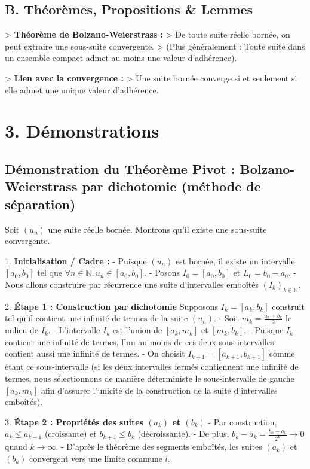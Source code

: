 \documentclass{report}
\begin{document}
\subsection*{B. Théorèmes, Propositions \& Lemmes}
> \textbf{Théorème de Bolzano-Weierstrass :}
> De toute suite réelle bornée, on peut extraire une sous-suite convergente.
> (Plus généralement : Toute suite dans un ensemble compact admet au moins une valeur d'adhérence).

> \textbf{Lien avec la convergence :}
> Une suite bornée converge si et seulement si elle admet une unique valeur d'adhérence.

\section*{3. Démonstrations}

\subsection*{Démonstration du Théorème Pivot : Bolzano-Weierstrass par dichotomie (méthode de séparation)}
Soit $(u_n)$ une suite réelle bornée. Montrons qu'il existe une sous-suite convergente.

1. \textbf{Initialisation / Cadre :}
   - Puisque $(u_n)$ est bornée, il existe un intervalle $[a_0, b_0]$ tel que $\forall n \in \mathbb{N}, u_n \in [a_0, b_0]$.
   - Posons $I_0 = [a_0, b_0]$ et $L_0 = b_0 - a_0$.
   - Nous allons construire par récurrence une suite d'intervalles emboîtés $(I_k)_{k \in \mathbb{N}}$.

2. \textbf{Étape 1 : Construction par dichotomie}
   Supposons $I_k = [a_k, b_k]$ construit tel qu'il contient une infinité de termes de la suite $(u_n)$.
   - Soit $m_k = \frac{a_k + b_k}{2}$ le milieu de $I_k$.
   - L'intervalle $I_k$ est l'union de $[a_k, m_k]$ et $[m_k, b_k]$.
   - Puisque $I_k$ contient une infinité de termes, l'un au moins de ces deux sous-intervalles contient aussi une infinité de termes.
   - On choisit $I_{k+1} = [a_{k+1}, b_{k+1}]$ comme étant ce sous-intervalle (si les deux intervalles fermés contiennent une infinité de termes, nous sélectionnons de manière déterministe le sous-intervalle de gauche $[a_k, m_k]$ afin d'assurer l'unicité de la construction de la suite d'intervalles emboîtés).

3. \textbf{Étape 2 : Propriétés des suites $(a_k)$ et $(b_k)$}
   - Par construction, $a_k \le a_{k+1}$ (croissante) et $b_{k+1} \le b_k$ (décroissante).
   - De plus, $b_k - a_k = \frac{b_0 - a_0}{2^k} \to 0$ quand $k \to \infty$.
   - D'après le théorème des segments emboîtés, les suites $(a_k)$ et $(b_k)$ convergent vers une limite commune $l$.
\end{document}
